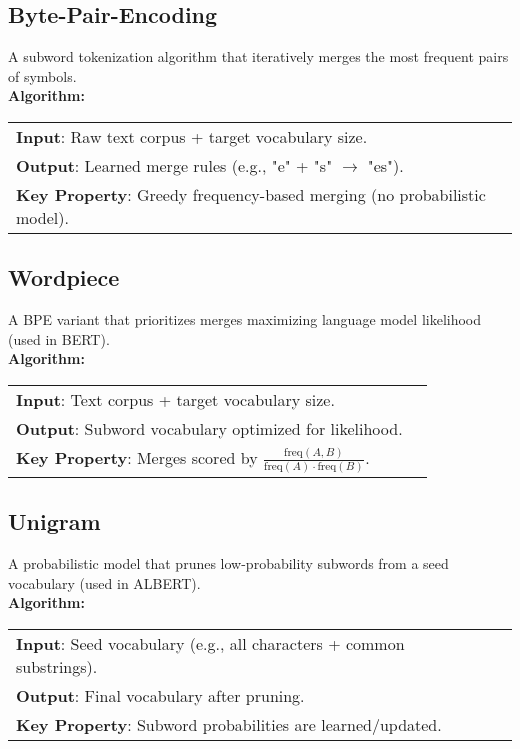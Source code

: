 \subsection{Byte-Pair-Encoding}\label{Section2.1.2}
    A subword tokenization algorithm that iteratively merges the most frequent pairs of symbols. \\
    \textbf{Algorithm:} \\
    \begin{tabular}{ll}  
        \textbf{Input}: Raw text corpus + target vocabulary size.  \\
        \textbf{Output}: Learned merge rules (e.g., "e" + "s" $\rightarrow$ "es").  \\
        \textbf{Key Property}: Greedy frequency-based merging (no probabilistic model).  \\
    \end{tabular} 

\subsection{Wordpiece}\label{Section2.1.3}
    A BPE variant that prioritizes merges maximizing language model likelihood (used in BERT). \\
    \textbf{Algorithm:} \\
    \begin{tabular}{ll}  
        \textbf{Input}: Text corpus + target vocabulary size.  \\
        \textbf{Output}: Subword vocabulary optimized for likelihood.  \\
        \textbf{Key Property}: Merges scored by $\frac{\text{freq}(A,B)}{\text{freq}(A) \cdot \text{freq}(B)}$.  \\
    \end{tabular}   

\subsection{Unigram}\label{Section2.1.4}
    A probabilistic model that prunes low-probability subwords from a seed vocabulary (used in ALBERT). \\
    \textbf{Algorithm:} \\
    \begin{tabular}{ll}  
        \textbf{Input}: Seed vocabulary (e.g., all characters + common substrings).  \\
        \textbf{Output}: Final vocabulary after pruning.  \\
        \textbf{Key Property}: Subword probabilities are learned/updated.  \\
    \end{tabular}   

